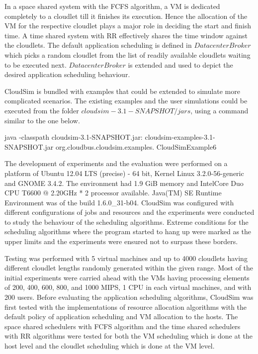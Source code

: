 \documentclass[times, 10pt,twocolumn]{article}
\begin{document}
In a space shared system with the FCFS algorithm, a VM is dedicated completely to a cloudlet till it finishes its execution. Hence the allocation of the VM for the respective cloudlet plays a major role in deciding the start and finish time. A time shared system with RR effectively shares the time window against the cloudlets. The default application scheduling is defined in $DatacenterBroker$ which picks a random cloudlet from the list of readily available cloudlets waiting to be executed next. $DatacenterBroker$ is extended and used to depict the desired application scheduling behaviour.

CloudSim is bundled with examples that could be extended to simulate more complicated scenarios. The existing examples and the user simulations could be executed from the folder $cloudsim-3.1-SNAPSHOT/jars$, using a command similar to the one below.
\begin{verbatimtab}
java -classpath
    cloudsim-3.1-SNAPSHOT.jar:
    cloudsim-examples-3.1-SNAPSHOT.jar 
    org.cloudbus.cloudsim.examples.
    CloudSimExample6
\end{verbatimtab}

The development of experiments and the evaluation were performed on a platform of Ubuntu 12.04 LTS (precise) - 64 bit, Kernel Linux 3.2.0-56-generic and GNOME 3.4.2. The environment had 1.9 GiB memory and Intel\textregistered Core Duo CPU T6600 @ 2.20GHz * 2 processor available. Java(TM) SE Runtime Environment was of the build 1.6.0\_31-b04.
CloudSim was configured with different configurations of jobs and resources and the experiments were conducted to study the behaviour of the scheduling algorithms. Extreme conditions for the scheduling algorithms where the program started to hang up were marked as the upper limits and the experiments were ensured not to surpass these borders. 

Testing was performed with 5 virtual machines and up to 4000 cloudlets having different cloudlet lengths randomly generated within the given range. Most of the initial experiments were carried ahead with the VMs having processing elements of 200, 400, 600, 800, and 1000 MIPS, 1 CPU in each virtual machines, and with 200 users.
Before evaluating the application scheduling algorithms, CloudSim was first tested with the implementations of resource allocation algorithms with the default policy of application scheduling and VM allocation to the hosts. The space shared schedulers with FCFS algorithm and the time shared schedulers with RR algorithms were tested for both the VM scheduling which is done at the host level and the cloudlet scheduling which is done at the VM level. 
\end{document}
